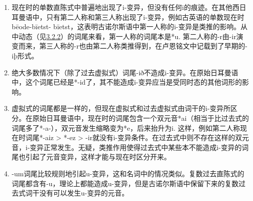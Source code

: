 \begin{enumerate}
    \item
          现在时的单数直陈式中普遍地出现了i-变异，但没有任何i的痕迹。在其他西日耳曼语中，只有第二人称和第三人称出现了i-变异，例如古英语的单数现在时bēode-bīetst-
          bīetst，这表明古诺尔斯语中第一人称的i-变异是类推的影响。从中动态（见\hyperref[ux5f3aux52a8ux8bcdux7684ux4e2dux52a8ux8bcdux5c3e]{3.2.2}）的词尾来看，第一人称的词尾本是*u.
          第二人称的-r由-ir演变而来，第三人称的-r也由第二人称类推得到，在卢恩铭文中记载到了早期的-iþ形式。
    \item
          绝大多数情况下（除了过去虚拟式）词尾-ið不造成i-变异。在原始日耳曼语中，这个词尾已经是*-id了，其不能造成i-变异应当是受同时态的其他词形的影响。
    \item
          \label{_Ref116919964}{}虚拟式的词尾都是一样的，但现在虚拟式和过去虚拟式由词干的i-变异所区分。在原始日耳曼语中，现在时的词尾包含一个双元音*ai（相当于比过去式的词尾多了*-a-），双元音发生缩略变为*e，后来抬升为i.
          这样，例如第二人称现在时词尾*-aiz \textgreater{} *-ez \textgreater{}
          -ir就没有i-变异条件。在过去式中则不存在这样的双元音，i-变异正常发生。无疑，类推作用使得过去式中某些本不能造成i-变异的词尾也引起了元音变异，这样才能与现在时区分开来。
    \item
          -um词尾比较规则地引起u-变异，这和名词中的情况类似。复数过去直陈式的词尾都含有-u，理论上都能造成u-变异，但是古诺尔斯语中保留下来的复数过去式词干没有可以发生u-变异的元音。
\end{enumerate}